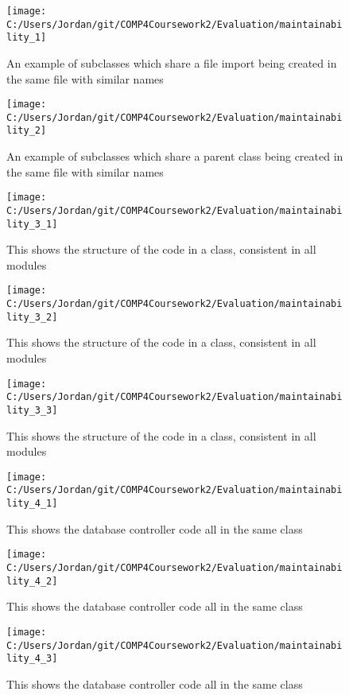\begin{figure}[H]
	\texttt{[image: C:/Users/Jordan/git/COMP4Coursework2/Evaluation/maintainability\_1]}
	\caption{An example of subclasses which share a file import being created in the same file with similar names}
\end{figure}

\begin{figure}[H]
	\texttt{[image: C:/Users/Jordan/git/COMP4Coursework2/Evaluation/maintainability\_2]}
	\caption{An example of subclasses which share a parent class being created in the same file with similar names}
\end{figure}

\begin{figure}[H]
	\texttt{[image: C:/Users/Jordan/git/COMP4Coursework2/Evaluation/maintainability\_3\_1]}
	\caption{This shows the structure of the code in a class, consistent in all modules}
\end{figure}

\begin{figure}[H]
	\texttt{[image: C:/Users/Jordan/git/COMP4Coursework2/Evaluation/maintainability\_3\_2]}
	\caption{This shows the structure of the code in a class, consistent in all modules}
\end{figure}

\begin{figure}[H]
	\texttt{[image: C:/Users/Jordan/git/COMP4Coursework2/Evaluation/maintainability\_3\_3]}
	\caption{This shows the structure of the code in a class, consistent in all modules}
\end{figure}

\begin{figure}[H]
	\texttt{[image: C:/Users/Jordan/git/COMP4Coursework2/Evaluation/maintainability\_4\_1]}
	\caption{This shows the database controller code all in the same class}
\end{figure}

\begin{figure}[H]
	\texttt{[image: C:/Users/Jordan/git/COMP4Coursework2/Evaluation/maintainability\_4\_2]}
	\caption{This shows the database controller code all in the same class}
\end{figure}

\begin{figure}[H]
	\texttt{[image: C:/Users/Jordan/git/COMP4Coursework2/Evaluation/maintainability\_4\_3]}
	\caption{This shows the database controller code all in the same class}
\end{figure}

